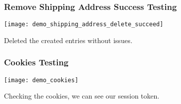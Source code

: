 \subsubsection[Remove Shipping Address Success Testing ]{Remove Shipping Address Success Testing}
\begin{center}
    \texttt{[image: demo\_shipping\_address\_delete\_succeed]}
\end{center}
\begin{flushleft}
    Deleted the created entries without issues.
\end{flushleft}

\subsubsection[Cookies Testing]{Cookies Testing}
\begin{center}
    \texttt{[image: demo\_cookies]}
\end{center}
\begin{flushleft}
    Checking the cookies, we can see our session token.
\end{flushleft}


